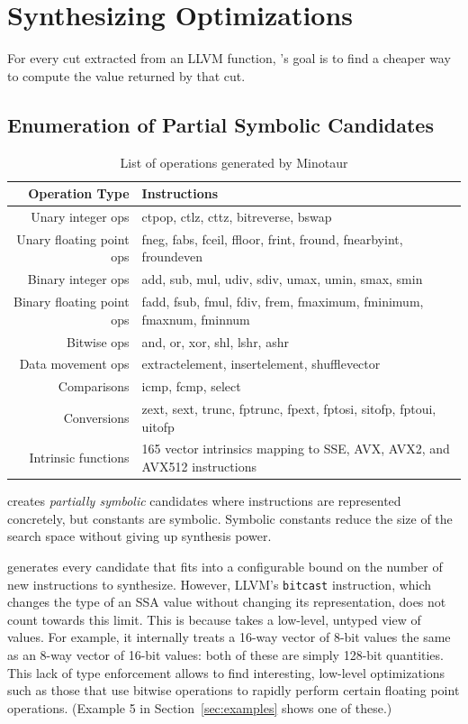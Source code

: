 
\section{Synthesizing Optimizations}

For every cut extracted from an LLVM function, \minotaur{}'s goal is to
find a cheaper way to compute the value returned by that cut.


\subsection{Enumeration of Partial Symbolic Candidates}

\begin{table}[t]
  \centering
  \small
  \begin{tabular}{ r | l }
    \hline
    \textbf{Operation Type} & \textbf{Instructions} \\
    \hline \hline
    Unary integer ops & ctpop, ctlz, cttz, bitreverse, bswap \\
    Unary floating point ops & fneg, fabs, fceil, ffloor, frint, fround, fnearbyint, froundeven \\
    Binary integer ops & add, sub, mul, udiv, sdiv, umax, umin, smax, smin\\
    Binary floating point ops & fadd, fsub, fmul, fdiv, frem, fmaximum, fminimum, fmaxnum, fminnum \\
    Bitwise ops & and, or, xor, shl, lshr, ashr \\
    Data movement ops & extractelement, insertelement, shufflevector \\
    Comparisons & icmp, fcmp, select \\
    Conversions & zext, sext, trunc, fptrunc, fpext, fptosi, sitofp, fptoui, uitofp \\
    Intrinsic functions & 165 vector intrinsics mapping to SSE, AVX, AVX2, and AVX512 instructions \\
    \hline
  \end{tabular}
  \caption{List of operations generated by Minotaur}
  \label{tab:operations}
\end{table}


\minotaur{} creates \emph{partially symbolic} candidates where
instructions are represented concretely, but constants are symbolic.
%
Symbolic constants reduce the size of the search space without giving
up synthesis power.


\minotaur{} generates every candidate that fits into a configurable bound
on the number of new instructions to synthesize.
%
However, LLVM's \texttt{bitcast} instruction, which changes the type
of an SSA value without changing its representation, does not count
towards this limit.
%
This is because \minotaur{} takes a low-level, untyped view of values.
%
For example, it internally treats a 16-way vector of 8-bit values the
same as an 8-way vector of 16-bit values: both of these are simply
128-bit quantities.
%
This lack of type enforcement allows \minotaur{} to find interesting,
low-level optimizations such as those that use bitwise operations to
rapidly perform certain floating point operations.
%
(Example 5 in Section~\ref{sec:examples} shows one of these.)



